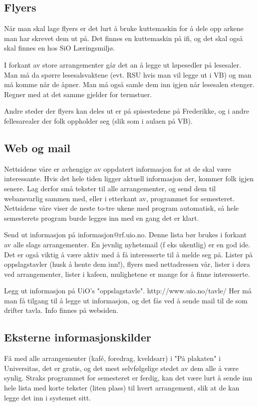 \subsection{Flyers}
Når man skal lage flyers er det lurt å bruke kuttemaskin for å dele opp
arkene man har skrevet dem ut på. Det finnes en kuttemaskin på ifi,
og det skal også skal finnes en hos SiO Læringsmiljø.

I forkant av store arrangementer går det an å legge ut løpesedler på
lesesaler. Man må da spørre lesesalsvaktene (evt. RSU hvis man vil legge
ut i VB) og man må komme når de åpner. Man må også samle dem inn igjen når
lesesalen stenger. Regner med at det samme gjelder for termstuer.

Andre steder der flyers kan deles ut er på spisestedene på Frederikke, og i andre fellesarealer der folk oppholder seg (slik som i aulaen på VB).

\subsection{Web og mail}
Nettsidene våre er avhengige av oppdatert informasjon for at de skal være
interessante. Hvis det hele tiden ligger aktuell informasjon der, kommer
folk igjen senere. Lag derfor små tekster til alle arrangementer, og
send dem til webansvarlig sammen med, eller i etterkant av, programmet
for semesteret. Nettsidene våre viser de neste to-tre ukene med program
automatisk, så hele semesterets program burde legges inn med en gang det
er klart.

Send ut informasjon på informasjon@rf.uio.no. Denne lista bør brukes i
forkant av alle slags arrangementer. En jevnlig nyhetsmail (f eks ukentlig)
er en god ide. Det er også viktig å være aktiv med å få interesserte til å melde seg på.
Lister på oppslagstavler (husk å hente dem inn!), flyers med nettadressen vår,
lister i døra ved arrangementer, lister i kafeen, mulighetene er mange for
å finne interesserte.

Legg ut informasjon på UiO's "oppslagstavle". http://www.uio.no/tavle/
Her må man få tilgang til å legge ut informasjon, og det fås ved å sende
mail til de som drifter tavla. Info finnes på websiden.


\subsection{Eksterne informasjonskilder}
Få med alle arrangementer (kafé, foredrag, kveldsarr) i "På plakaten" i
Universitas, det er gratis, og det mest selvfølgelige stedet av dem alle
å være synlig. Straks programmet for semesteret er ferdig, kan det være lurt
å sende inn hele lista med korte tekster (liten plass) til hvert arrangement,
slik at de kan legge det inn i systemet sitt.

